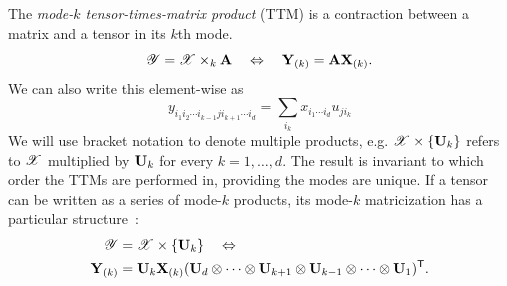 %
The \emph{mode-$k$ tensor-times-matrix product} (TTM) is a contraction
between a matrix and a tensor in its $k$th mode.
\begin{equation}
\label{eqn:ttm}
\T{Y} = \T{X} \times_k \M{A} \quad \Leftrightarrow \quad \M{Y}_{(k)} = \M{A}\M{X}_{(k)}.
\end{equation}
We can also write this element-wise as
\begin{equation}
  \label{eqn:contractionelem}
  y_{i_1i_2\cdots i_{k-1}j i_{k+1}\cdots i_d} = \sum_{i_k}x_{i_1\cdots i_d}u_{j i_k}
\end{equation}
We will use bracket notation to denote multiple products, e.g. 
$\T{X} \times \{\Mn{U}{k}\}$ refers to $\T{X}$ multiplied by $\Mn{U}{k}$ 
for every $k=1,\dots,d$. The result is invariant to which order the TTMs are performed in, 
providing the modes are unique. If a tensor can be written as a series of 
mode-$k$ products, its mode-$k$ matricization has a particular structure~\cite{Kolda:2009}:
\begin{align}
  \begin{split}
    \label{eqn:ttensor}\T{Y} & ={}  \T{X} \times \{\Mn{U}{k}\} \quad \Leftrightarrow \\
    \M{Y}_{(k)} & ={}  \Mn{U}{k} \M{X}_{(k)} 
    (\Mn{U}{d} \otimes \cdots \otimes \Mn{U}{k+1} \otimes \Mn{U}{k-1} \otimes \cdots \otimes \Mn{U}{1})^\trans.
  \end{split}
\end{align}
%
